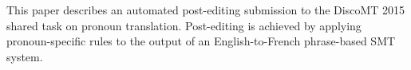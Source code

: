 This paper describes an automated post-editing submission to the DiscoMT 2015 shared task on pronoun translation. Post-editing is achieved by applying pronoun-specific rules to the output of an English-to-French phrase-based SMT system.
